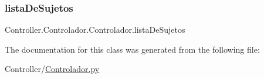 \subsubsection{\texorpdfstring{lista\+De\+Sujetos}{listaDeSujetos}}
{\footnotesize\ttfamily Controller.\+Controlador.\+Controlador.\+lista\+De\+Sujetos}



The documentation for this class was generated from the following file\+:\begin{DoxyCompactItemize}
\item 
Controller/\hyperlink{_controlador_8py}{Controlador.\+py}\end{DoxyCompactItemize}
